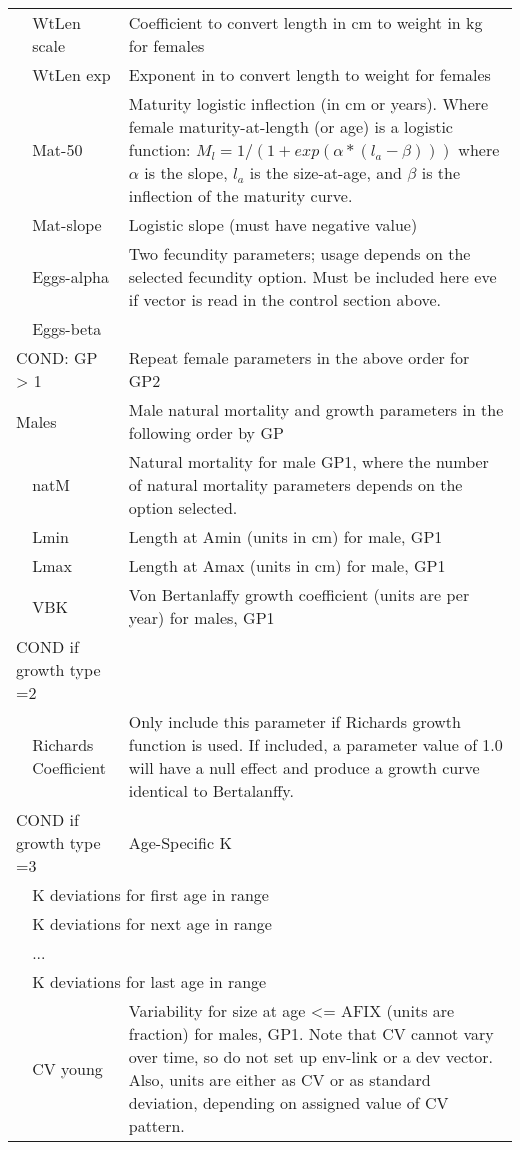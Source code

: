 \begin{center}
\begin{longtable}{p{1cm} p{2.5cm} p{10cm}}
		\hline
		& WtLen scale & Coefficient to convert length in cm to weight in kg for females\\
		& WtLen exp & Exponent in to convert length to weight for females\\
		& Mat-50 & Maturity logistic inflection (in cm or years).  Where female maturity-at-length (or age) is a logistic function: $M_{l} = 1/(1+exp(\alpha*(l_{a} - \beta)))$ where $\alpha$ is the slope, $l_{a}$ is the size-at-age, and $\beta$ is the inflection of the maturity curve. \\ 
		& Mat-slope & Logistic slope (must have negative value) \\
		& Eggs-alpha & Two fecundity parameters; usage depends on the selected fecundity option.  Must be included here eve if vector is read in the control section above.\\
		& Eggs-beta & \\
		\hline
		\multicolumn{2}{l}{COND: GP > 1} & Repeat female parameters in the above order for GP2\\
		\hline
		\multicolumn{2}{l}{Males} & Male natural mortality and growth parameters in the following order by GP\\
		& natM & Natural mortality for male GP1, where the number of natural mortality parameters depends on the option selected.\\
		& Lmin & Length at Amin (units in cm) for male, GP1\\
		& Lmax & Length at Amax (units in cm) for male, GP1\ \\
		& VBK &  Von Bertanlaffy growth coefficient (units are per year) for males, GP1\\
		\hline
		\multicolumn{2}{l}{COND if growth type =2 } & \\
		& Richards Coefficient & Only include this parameter if Richards growth function is used.  If included, a parameter value of 1.0 will have a null effect and produce a growth curve identical to Bertalanffy.\\
		\multicolumn{2}{l}{COND if growth type =3 } & Age-Specific K \\
		& \multicolumn{2}{l}{K deviations for first age in range}\\
		& \multicolumn{2}{l}{K deviations for next age in range}\\
		& ... & \\
		& \multicolumn{2}{l}{K deviations for last age in range}\\
		\hline
		& CV young & Variability for size at age <= AFIX (units are fraction) for males, GP1.  Note that CV cannot vary over time, so do not set up env-link or a dev vector.  Also, units are either as CV or as standard deviation, depending on assigned value of CV pattern.\\

\end{longtable}
\end{center}
